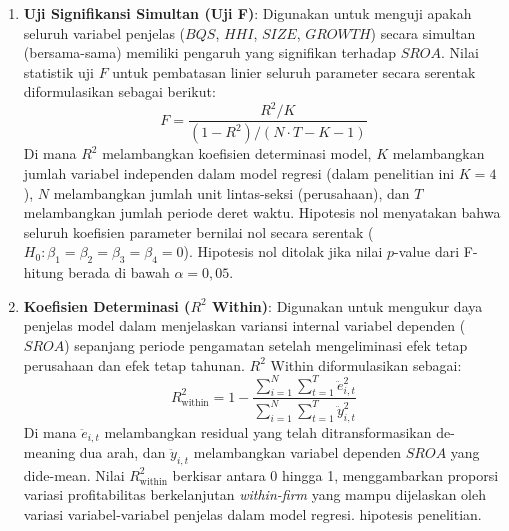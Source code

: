 \documentclass[12pt,a4paper]{article}
\providecommand{\tightlist}{%
  \setlength{\itemsep}{0pt}\setlength{\parskip}{0pt}%
}
\begin{document}
\begin{enumerate}
  \begin{itemize}
  \tightlist
  \item
    Pengujian satu arah kanan (\emph{right-tailed test}) untuk variabel
    BQS, HHI, dan SIZE, dengan hipotesis alternatif menyatakan koefisien
    bernilai positif lebih besar dari nol (\(H_a: \beta_k > 0\)).
  \item
    Pengujian satu arah kiri (\emph{left-tailed test}) untuk variabel
    GROWTH, dengan hipotesis alternatif menyatakan koefisien bernilai
    negatif kurang dari nol (\(H_a: \beta_k < 0\)). Keputusan penolakan
    hipotesis nol (\(H_0\)) diambil jika nilai statistik \(t\)-hitung
    melebihi nilai kritis distribusi \(t\) pada derajat kebebasan
    terkait, atau jika nilai \(p\)-value berada di bawah ambang batas
    signifikansi yang ditentukan (\(\alpha = 0,05\) atau
    \(\alpha = 0,10\)).
  \end{itemize}
\item
  \textbf{Uji Signifikansi Simultan (Uji F)}: Digunakan untuk menguji
  apakah seluruh variabel penjelas (\(BQS\), \(HHI\), \(SIZE\),
  \(GROWTH\)) secara simultan (bersama-sama) memiliki pengaruh yang
  signifikan terhadap \(SROA\). Nilai statistik uji \(F\) untuk
  pembatasan linier seluruh parameter secara serentak diformulasikan
  sebagai berikut: \begin{equation}
  F = \frac{R^2 / K}{(1 - R^2) / (N \cdot T - K - 1)}
  \end{equation} Di mana \(R^2\) melambangkan koefisien determinasi
  model, \(K\) melambangkan jumlah variabel independen dalam model
  regresi (dalam penelitian ini \(K = 4\)), \(N\) melambangkan jumlah
  unit lintas-seksi (perusahaan), dan \(T\) melambangkan jumlah periode
  deret waktu. Hipotesis nol menyatakan bahwa seluruh koefisien
  parameter bernilai nol secara serentak
  (\(H_0: \beta_1 = \beta_2 = \beta_3 = \beta_4 = 0\)). Hipotesis nol
  ditolak jika nilai \(p\)-value dari F-hitung berada di bawah
  \(\alpha = 0,05\).
\item
  \textbf{Koefisien Determinasi (\(R^2\) Within)}: Digunakan untuk
  mengukur daya penjelas model dalam menjelaskan variansi internal
  variabel dependen (\(SROA\)) sepanjang periode pengamatan setelah
  mengeliminasi efek tetap perusahaan dan efek tetap tahunan. \(R^2\)
  Within diformulasikan sebagai: \begin{equation}
  R^2_{\mathrm{within}} = 1 - \frac{\sum_{i=1}^N \sum_{t=1}^T \ddot{e}_{i,t}^2}{\sum_{i=1}^N \sum_{t=1}^T \ddot{y}_{i,t}^2}
  \end{equation} Di mana \(\ddot{e}_{i,t}\) melambangkan residual yang
  telah ditransformasikan de-meaning dua arah, dan \(\ddot{y}_{i,t}\)
  melambangkan variabel dependen \(SROA\) yang dide-mean. Nilai
  \(R^2_{\mathrm{within}}\) berkisar antara 0 hingga 1, menggambarkan
  proporsi variasi profitabilitas berkelanjutan \emph{within-firm} yang
  mampu dijelaskan oleh variasi variabel-variabel penjelas dalam model
  regresi. hipotesis penelitian.
\end{enumerate}
\end{document}
